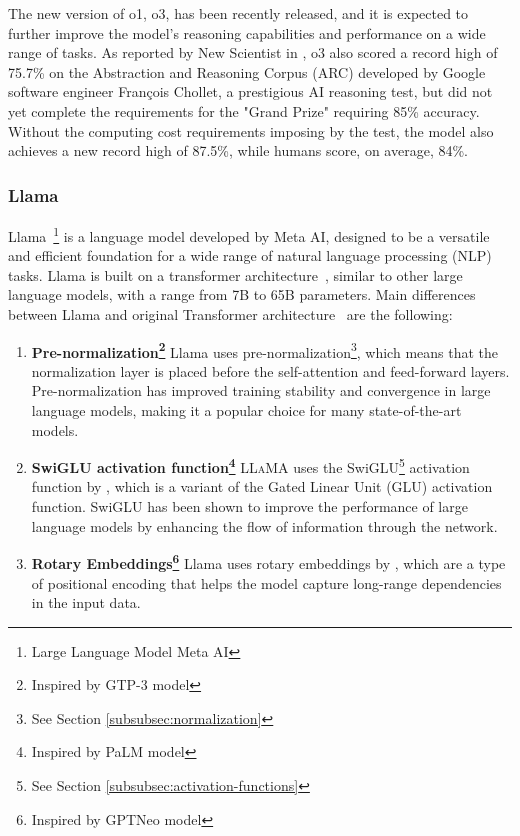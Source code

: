 The new version of o1, o3, has been recently released, and it is expected to further improve the model's reasoning capabilities and performance on a wide range of tasks.
As reported by New Scientist in \textcite{newscientist2024o3}, o3 also scored a record high of 75.7\% on the Abstraction and Reasoning Corpus (ARC) developed by Google software engineer François Chollet, a prestigious AI reasoning test, but did not yet complete the requirements for the "Grand Prize" requiring 85\% accuracy.
Without the computing cost requirements imposing by the test, the model also achieves a new record high of 87.5\%, while humans score, on average, 84\%.

\subsubsection{Llama}
\label{subsubsec:llama}

Llama~\footnote{Large Language Model Meta AI} is a language model developed by Meta AI, designed to be a versatile and efficient foundation for a wide range of natural language processing (NLP) tasks.
Llama is built on a transformer architecture~\cite{vaswani2023attention}, similar to other large language models, with a range from 7B to 65B parameters.
Main differences between Llama and original Transformer architecture~\cite{vaswani2023attention} are the following:
\begin{enumerate}
	\item \textbf{Pre-normalization\footnote{Inspired by GTP-3 model}} {Llama uses pre-normalization\footnote{See Section \ref{subsubsec:normalization}}, which means that the normalization layer is placed before the self-attention and feed-forward layers.
		      Pre-normalization has improved training stability and convergence in large language models, making it a popular choice for many state-of-the-art models.
	      }
	\item \textbf{SwiGLU activation function\footnote{Inspired by PaLM model}} {\textsc{LLaMA} uses the SwiGLU\footnote{See Section \ref{subsubsec:activation-functions}} activation function by \textcite{shazeer2020glu}, which is a variant of the Gated Linear Unit (GLU) activation function.
		      SwiGLU has been shown to improve the performance of large language models by enhancing the flow of information through the network.
	      }
	\item \textbf{Rotary Embeddings\footnote{Inspired by GPTNeo model}} {Llama uses rotary embeddings by \textcite{su2021roformer}, which are a type of positional encoding that helps the model capture long-range dependencies in the input data.
	      }
\end{enumerate}

